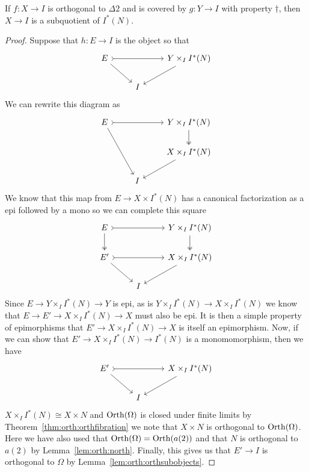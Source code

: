 \begin{thm}\label{thm:orth:seporth}
  If $f : X \to I$ is orthogonal to $\Delta 2$ and is covered by
  $g : Y \to I$ with property $\dagger$, then $X \to I$ is a
  subquotient of $I^*(N)$.
\end{thm}
\begin{proof}
  Suppose that $h : E \to I$ is the object so that
  \[
    \begin{tikzcd}
      E \ar[rr, rightarrowtail] \ar[dr] & & Y \times_I I^*(N) \ar[dl]\\
      & I &
    \end{tikzcd}
  \]
  We can rewrite this diagram as
  \[
    \begin{tikzcd}
      E \ar[rr, rightarrowtail] \ar[ddr] & & Y \times_I I^*(N) \ar[d, twoheadrightarrow]\\
      & & X \times_I I^*(N) \ar[dl]\\
      & I &
    \end{tikzcd}
  \]
  We know that this map from $E \to X \times I^*(N)$ has a canonical
  factorization as a epi followed by a mono so we can complete this
  square
  \[
    \begin{tikzcd}
      E \ar[rr, rightarrowtail] \ar[d, twoheadrightarrow] & & Y \times_I I^*(N) \ar[d, twoheadrightarrow]\\
      E' \ar[rr, rightarrowtail] \ar[dr] & & X \times_I I^*(N) \ar[dl]\\
      & I &
    \end{tikzcd}
  \]
  Since $E \to Y \times_I I^*(N) \to Y$ is epi, as is
  $Y \times_I I^*(N) \to X \times_I I^*(N)$ we know that
  $E \to E' \to X \times_I I^*(N) \to X$ must also be epi. It is then a
  simple property of epimorphisms that $E' \to X \times_I I^*(N) \to X$
  is itself an epimorphism. Now, if we can show that
  $E' \to X \times_I I^*(N) \to I^*(N)$ is a monomomorphism, then we
  have
  \[
    \begin{tikzcd}
      E' \ar[rr, rightarrowtail] \ar[dr] & & X \times_I I^*(N) \ar[dl]\\
      & I &
    \end{tikzcd}
  \]
  $X \times_I I^*(N) \cong X \times N$ and $\operatorname{Orth}(\Omega)$ is closed
  under finite limits by Theorem~\ref{thm:orth:orthfibration} we note
  that $X \times N$ is orthogonal to $\operatorname{Orth}(\Omega)$. Here we have
  also used that $\operatorname{Orth}(\Omega) = \operatorname{Orth}(a(2))$ and that $N$ is
  orthogonal to $a(2)$ by Lemma~\ref{lem:orth:north}. Finally, this
  gives us that $E' \to I$ is orthogonal to $\Omega$ by
  Lemma~\ref{lem:orth:orthsubobjects}.


\end{proof}
